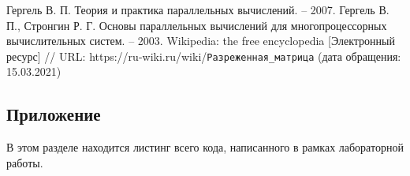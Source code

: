 \documentclass{report}
\begin{document}
\begin{thebibliography}{}
 Гергель В. П. Теория и практика параллельных вычислений. – 2007.
 Гергель В. П., Стронгин Р. Г. Основы параллельных вычислений для многопроцессорных вычислительных систем. – 2003.
Wikipedia: the free encyclopedia [Электронный ресурс] // URL: https://ru-wiki.ru/wiki/\verb|Разреженная_матрица| (дата обращения: 15.03.2021)
\end{thebibliography}{}
\newpage

\begin{center}
\section*{Приложение}
\end{center}
В этом разделе находится листинг всего кода, написанного в рамках лабораторной работы.
\end{document}
